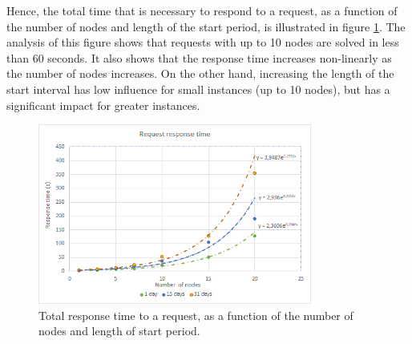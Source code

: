 Hence, the total time that is necessary to respond to a request, as a function of the number of nodes and length of the start period, is illustrated in figure \ref{fig:response_time}. The analysis of this figure shows that requests with up to 10 nodes are solved in less than 60 seconds. It also shows that the response time increases non-linearly as the number of nodes increases. On the other hand, increasing the length of the start interval has low influence for small instances (up to 10 nodes), but has a significant impact for greater instances.

\begin{figure}
  \centering
  \includegraphics[width=9cm]{./imgs/response_time.png}
  \caption{Total response time to a request, as a function of the number of nodes and length of start period.}
  \label{fig:response_time}  
\end{figure}










